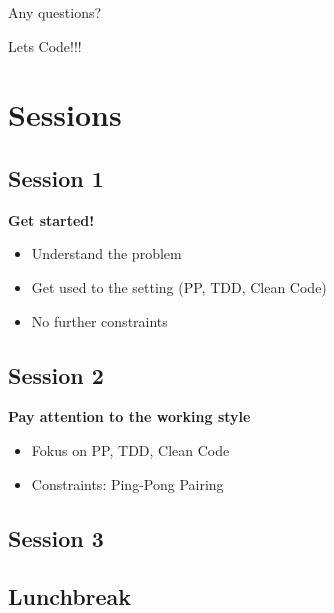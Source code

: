 \documentclass[12pt, xcolor=table, dvipsnames]{beamer}
\begin{document}
\begin{frame}[plain]
\begin{center}
\Huge
Any questions?

\pause
Lets Code!!!
\end{center}
\end{frame}



\section{Sessions}



\subsection{Session 1}
\begin{frame}[squeeze]{\subsecname{}}
	\textbf{\Large Get started!}
	\begin{itemize}
		\item Understand the problem 
		\item Get used to the setting (PP, TDD, Clean Code)
		\item No further constraints
	\end{itemize}
\end{frame}


\subsection{Session 2}
\begin{frame}[squeeze]{\subsecname{}}
	\textbf{\Large Pay attention to the working style}
	\begin{itemize}
		\item Fokus on PP, TDD, Clean Code
		\item Constraints: Ping-Pong Pairing
	\end{itemize}
\end{frame}

\subsection{Session 3}
\begin{frame}[squeeze]{\subsecname{}}
\end{frame}

\subsection{Lunchbreak}
\begin{frame}[squeeze]{\subsecname{}}
\end{frame}
\end{document}
